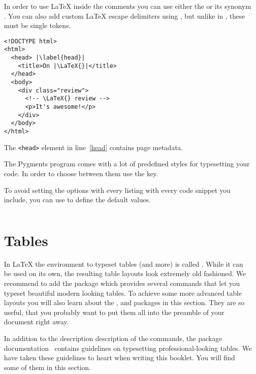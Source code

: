 In order to use \LaTeX{} inside the comments you can use either the
 or its synonym . You can also add custom
\LaTeX{} escape delimiters using , but unlike in
, these must be single tokens.
\begin{example}
\begin{verbatim}
<!DOCTYPE html>
<html>
  <head> |\label{head}|
    <title>On |\LaTeX{}|</title>
  </head>
  <body>
    <div class="review">
      <!-- \LaTeX{} review -->
      <p>It's awesome!</p>
    </div>
  </body>
</html>
\end{verbatim}
The \texttt{<head>} 
element in line~\ref{head}
contains page metadata.
\end{example}

The Pygments program comes with a lot of predefined styles for typesetting your
code. In order to choose between them use the  key.

To avoid setting the options with every listing with every code snippet you
include, you can use  to define the default values.
\begin{example}
\inputminted{c++}{goodbye.cpp}
\end{example}

\section{Tables}\label{sec:tables}

In \LaTeX{} the environment to typeset tables (and more) is called
. While it can be used on its own, the resulting table layouts look
extremely old fashioned. We recommend to add the  package which
provides several commands that let you typeset beautiful modern looking tables.
To achieve some more advanced table layouts you will also learn about the
,  and  packages in this section.
They are so useful, that you probably want to put them all into the preamble of
your document right away.

In addition to the description description of the commands, the 
package documentation~\cite{pack:booktabs} contains guidelines on typesetting
professional-looking tables. We have taken these guidelines to heart when
writing this booklet. You will find some of them in this section.

